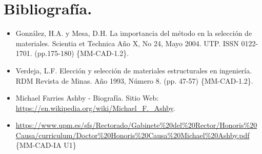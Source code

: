 \documentclass[12pt,a4paper]{article}
\begin{document}
\section{Bibliografía.}
\begin{itemize}
    \item González, H.A. y Mesa, D.H. La importancia del método en la selección de materiales. Scientia et Technica Año X, No 24, Mayo 2004. UTP. ISSN 0122-1701. (pp.175-180) \{MM-CAD-1.2\}.
    \item Verdeja, L.F.  Elección y selección de materiales estructurales en ingeniería. RDM Revista de Minas. Año 1993, Número 8.  (pp. 47-57) \{MM-CAD-1.2\}.
    \item Michael Farries Ashby - Biografía. Sitio Web: \url{https://en.wikipedia.org/wiki/Michael_F._Ashby}.
    \item \url{https://www.upm.es/sfs/Rectorado/Gabinete%20del%20Rector/Honoris%20Causa/curriculum/Doctor%20Honoris%20Causa%20Michael%20Ashby.pdf} \{MM-CAD-IA U1\}
\end{itemize}
\end{document}
